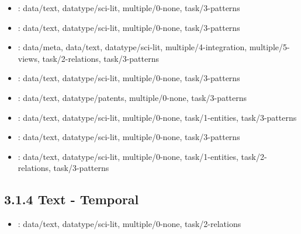 \begin {refsection}
\begin {itemize}
\item \cite {wong-2004-in-spire-infovis-2004-contest-entry}:
    data/text, datatype/sci-lit, multiple/0-none, task/3-patterns


\item \cite {lee-2012-ivisclustering:-an-interactive-visual-document-clustering}:
    data/text, datatype/sci-lit, multiple/0-none, task/3-patterns


\item \cite {goerg-2013-combining-computational-analyses-and-interactive-visualization}:
    data/meta, data/text, datatype/sci-lit, multiple/4-integration, multiple/5-views, task/2-relations, task/3-patterns


\item \cite {oelke-2014-comparative-exploration-of-document-collections:-a-visual}:
    data/text, datatype/sci-lit, multiple/0-none, task/3-patterns


\item \cite {kohonen-2000-self-organization-of-a-massive-document-collection}:
    data/text, datatype/patents, multiple/0-none, task/3-patterns


\item \cite {dou-2011-paralleltopics:-a-probabilistic-approach-to-exploring-document}:
    data/text, datatype/sci-lit, multiple/0-none, task/1-entities, task/3-patterns


\item \cite {fried-2014-maps-of-computer-science}:
    data/text, datatype/sci-lit, multiple/0-none, task/3-patterns


\item \cite {chuang-2012-termite:-visualization-techniques-for-assessing-textual}:
    data/text, datatype/sci-lit, multiple/0-none, task/1-entities, task/2-relations, task/3-patterns


\end {itemize}
\printbibliography
\end {refsection}\pagebreak

\begin {refsection}
\section [3.1.4 Text - Temporal] {3.1.4 Text - Temporal}

\begin {itemize}
\item \cite {osborne-2013-exploring-scholarly-data-with-rexplore}:
    data/text, datatype/sci-lit, multiple/0-none, task/2-relations


\end {itemize}
\printbibliography
\end {refsection}\pagebreak

